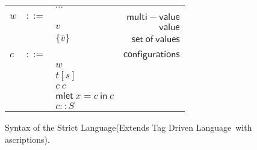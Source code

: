 \documentclass[preprint,authoryear,sort&compress,9pt,nocopyrightspace]{article}
\newcommand{\ascripS}[1]{#1::S}
\newcommand{\oletP}[3]{\mathsf{mlet} \ x = #2 \ \mathsf{in}  \ #3}
\newcommand{\semanticB}{Tag Driven Language}
\newcommand{\semanticC}{Strict Language}
\begin{document}
\setlength{\topmargin}{-25mm}
\setlength{\textheight}{230mm}
\begin{figure}[]
\begin{small}
\begin{center}
\hspace*{-2cm}
\begin{tabular}{|l c l r|}
\hline
&&$\cdots$&\\
$w$&$::=$&&$\mathsf {multi-value}$\\
&&$v$&$\mathsf {value}$\\
&&$\{\overline{v}\}$&$\mathsf {set \ of \ values}$\\
&&&\\
$c$&$::=$&&$\mathsf {configurations}$\\
&&$w$&\\
&&$t[s]$&\\
&&$c \ c $&\\
&&$\oletP {T}{c}{c}$&\\
&&$\ascripS{c}$&\\
\hline
\end{tabular}
\hspace*{-2cm}
\caption{Syntax of the \semanticC (Extends \semanticB \  with ascriptions).}
\label{figure:sencilla}
\end{center}
\end{small}
\end{figure}
\end{document}
